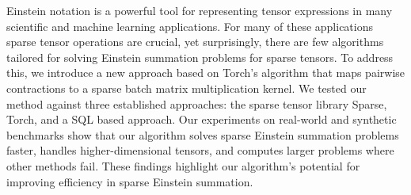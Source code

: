 Einstein notation is a powerful tool for representing tensor expressions in many scientific and
machine learning applications. For many of these applications sparse tensor operations are crucial,
yet surprisingly, there are few algorithms tailored for solving Einstein summation problems for sparse tensors.
To address this, we introduce a new approach based on Torch's algorithm that maps pairwise contractions
to a sparse batch matrix multiplication kernel. We tested our method against three established approaches:
the sparse tensor library Sparse, Torch, and a SQL based approach. Our experiments on real-world and
synthetic benchmarks show that our algorithm solves sparse Einstein summation problems faster, handles
higher-dimensional tensors, and computes larger problems where other methods fail. These findings highlight
our algorithm's potential for improving efficiency in sparse Einstein summation.
